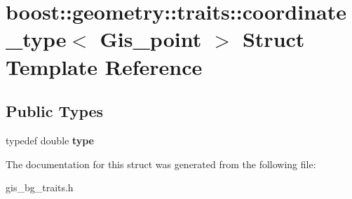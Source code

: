 \hypertarget{structboost_1_1geometry_1_1traits_1_1coordinate__type_3_01Gis__point_01_4}{}\section{boost\+:\+:geometry\+:\+:traits\+:\+:coordinate\+\_\+type$<$ Gis\+\_\+point $>$ Struct Template Reference}
\label{structboost_1_1geometry_1_1traits_1_1coordinate__type_3_01Gis__point_01_4}
\subsection*{Public Types}
\begin{DoxyCompactItemize}
\item 
\mbox{\label{structboost_1_1geometry_1_1traits_1_1coordinate__type_3_01Gis__point_01_4_a545811f8015bd98d7e5e3234dd9ddee3}} 
typedef double {\bfseries type}
\end{DoxyCompactItemize}


The documentation for this struct was generated from the following file\+:\begin{DoxyCompactItemize}
\item 
gis\+\_\+bg\+\_\+traits.\+h\end{DoxyCompactItemize}
